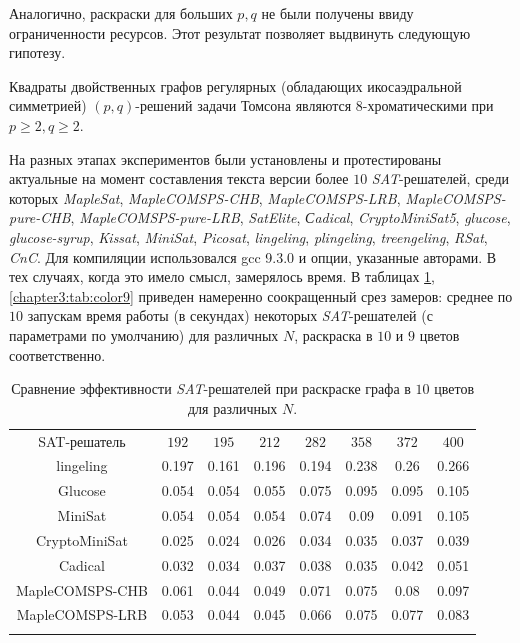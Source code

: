 Аналогично, раскраски для больших $p,q$ не были получены ввиду ограниченности ресурсов. 
Этот результат позволяет выдвинуть следующую гипотезу.

\begin{hypothesis}
Квадраты двойственных графов регулярных (обладающих икосаэдральной симметрией) $(p,q)$-решений задачи Томсона  
являются $8$-хроматическими при $p \ge 2, q \ge 2$.
\end{hypothesis}

На разных этапах экспериментов были установлены и протестированы актуальные на момент составления текста 
версии более $10$ \textit{SAT}-решателей, среди которых
\textit{MapleSat},
\textit{Maple\-COM\-SPS-CHB},
\textit{Maple\-COM\-SPS-LRB},
\textit{Maple\-COM\-SPS-pure-CHB},
\textit{Maple\-COM\-SPS-pure-LRB},
\textit{Sat\-Elite},
\textit{Сadical},
\textit{Crypto\-Mini\-Sat5},
\textit{glu\-co\-se},
\textit{glucose-syrup},
\textit{Kissat},
\textit{Mini\-Sat},
\textit{Picosat},
\textit{lin\-ge\-ling},
\textit{plin\-ge\-ling},
\textit{treen\-ge\-ling},
\textit{RSat},
\textit{CnC}. 
Для компиляции использовался gcc 9.3.0 и опции, указанные авторами. 
В тех случаях, когда это имело смысл, замерялось время. 
В таблицах \ref{chapter3:tab:color10}, \ref{chapter3:tab:color9} 
приведен намеренно соокращенный срез замеров: 
среднее по $10$ запускам время работы (в секундах) некоторых \textit{SAT}-решателей (с параметрами по умолчанию) 
для различных $N$, раскраска в $10$ и $9$ цветов соответственно.

\begin{table}[h!]
\centering
\captionsetup{justification=centering}
\caption{Сравнение эффективности \textit{SAT}-решателей при раскраске графа в $10$ цветов для различных $N$.} 
\label{chapter3:tab:color10}
\begin{tabular}{@{}|c|c|c|c|c|c|c|c|} 
\Xhline{4\arrayrulewidth}
SAT-решатель          & $192$ & $195$ & $212$ & $282$ & $358$ & $372$ & $400$ \\ \Xhline{4\arrayrulewidth}
lingeling             & 0.197 & 0.161 & 0.196 & 0.194 & 0.238 & 0.26  & 0.266 \\ \hline
Glucose               & 0.054 & 0.054 & 0.055 & 0.075 & 0.095 & 0.095 & 0.105 \\ \hline
MiniSat               & 0.054 & 0.054 & 0.054 & 0.074 & 0.09  & 0.091 & 0.105 \\ \hline
CryptoMiniSat         & 0.025 & 0.024 & 0.026 & 0.034 & 0.035 & 0.037 & 0.039 \\ \hline
Cadical               & 0.032 & 0.034 & 0.037 & 0.038 & 0.035 & 0.042 & 0.051 \\ \hline
MapleCOMSPS-CHB       & 0.061 & 0.044 & 0.049 & 0.071 & 0.075 & 0.08  & 0.097 \\ \hline
MapleCOMSPS-LRB       & 0.053 & 0.044 & 0.045 & 0.066 & 0.075 & 0.077 & 0.083 \\ \Xhline{4\arrayrulewidth}
\end{tabular}
\end{table}

